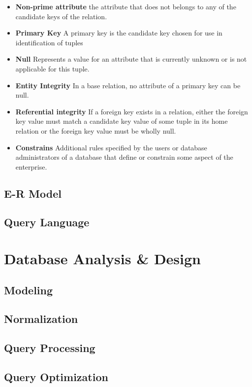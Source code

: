 \begin{itemize}
	\item \textbf{Non-prime attribute} the attribute that does not belongs to any of the candidate keys of the relation.
	\item \textbf{Primary Key} A primary key is the candidate key chosen for use in identification of tuples
	\item \textbf{Null} Represents a value for an attribute that is currently unknown or is not applicable for this tuple.
	\item \textbf{Entity Integrity} In a base relation, no attribute of a primary key can be null.
	\item \textbf{Referential integrity} If a foreign key exists in a relation, either the foreign key value must match a candidate key value of some tuple in its home relation or the foreign key value must be wholly null.
	\item \textbf{Constrains} Additional rules specified by the users or database administrators of a database that define or constrain some aspect of the enterprise.
\end{itemize}

\section{E-R Model}
\section{}
\section{Query Language}

\chapter{Database Analysis \& Design}
\section{Modeling}
\section{Normalization}
\section{Query Processing}
\section{Query Optimization}

